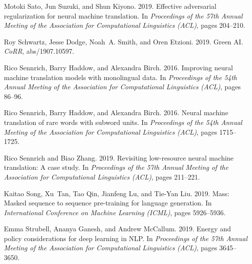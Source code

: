 \documentclass[11pt]{article}
\begin{document}
\begin{thebibliography}{47}
Motoki Sato, Jun Suzuki, and Shun Kiyono. 2019.
\newblock Effective adversarial regularization for neural machine translation.
\newblock In \emph{Proceedings of the 57th Annual Meeting of the Association
  for Computational Linguistics (ACL)}, pages 204--210.

Roy Schwartz, Jesse Dodge, Noah~A. Smith, and Oren Etzioni. 2019.
\newblock Green {AI}.
\newblock \emph{CoRR}, abs/1907.10597.

Rico Sennrich, Barry Haddow, and Alexandra Birch. 2016{}.
\newblock Improving neural machine translation models with monolingual data.
\newblock In \emph{Proceedings of the 54th Annual Meeting of the Association
  for Computational Linguistics (ACL)}, pages 86--96.

Rico Sennrich, Barry Haddow, and Alexandra Birch. 2016{}.
\newblock Neural machine translation of rare words with subword units.
\newblock In \emph{Proceedings of the 54th Annual Meeting of the Association
  for Computational Linguistics (ACL)}, pages 1715--1725.

Rico Sennrich and Biao Zhang. 2019.
\newblock Revisiting low-resource neural machine translation: A case study.
\newblock In \emph{Proceedings of the 57th Annual Meeting of the Association
  for Computational Linguistics (ACL)}, pages 211--221.

Kaitao Song, Xu~Tan, Tao Qin, Jianfeng Lu, and Tie-Yan Liu. 2019.
\newblock Mass: Masked sequence to sequence pre-training for language
  generation.
\newblock In \emph{International Conference on Machine Learning (ICML)}, pages
  5926--5936.

Emma Strubell, Ananya Ganesh, and Andrew McCallum. 2019.
\newblock Energy and policy considerations for deep learning in {NLP}.
\newblock In \emph{Proceedings of the 57th Annual Meeting of the Association
  for Computational Linguistics (ACL)}, pages 3645--3650.


\end{thebibliography}
\end{document}
